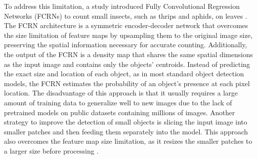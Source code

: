 To address this limitation, a study introduced Fully Convolutional Regression Networks (FCRNs) to count small insects, such as thrips and aphids, on leaves \cite{bereciartua-perez_multiclass_2023}. The FCRN architecture is a symmetric encoder-decoder network that overcomes the size limitation of feature maps by upsampling them to the original image size, preserving the spatial information necessary for accurate counting. Additionally, the output of the FCRN is a density map that shares the same spatial dimensions as the input image and contains only the objects' centroids. Instead of predicting the exact size and location of each object, as in most standard object detection models, the FCRN estimates the probability of an object's presence at each pixel location. The disadvantage of this approach is that it usually requires a large amount of training data to generalize well to new images due to the lack of pretrained models on public datasets containing millions of images. Another strategy to improve the detection of small objects is slicing the input image into smaller patches and then feeding them separately into the model. This approach also overcomes the feature map size limitation, as it resizes the smaller patches to a larger size before processing \cite{hong_automatic_2021,bereciartua-perez_multiclass_2023}.